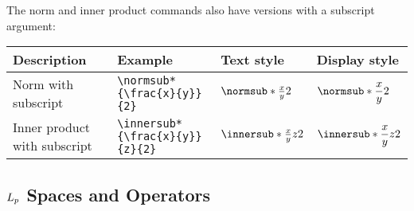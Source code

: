 \documentclass{article}
\begin{document}
The norm and inner product commands also have versions with a subscript argument:

\begin{center}
\begin{tabular}{@{}llll@{}}
\toprule
Description				& Example 					& Text style 				& Display style \\ \midrule
Norm	with subscript				& \verb!\normsub*{\frac{x}{y}}{2}!       	& $\normsub*{\frac{x}{y}}{2}$ 	& $\displaystyle\normsub*{\frac{x}{y}}{2}$ \\[10pt]
Inner product with subscript			& \verb!\innersub*{\frac{x}{y}}{z}{2}!       	& $\innersub*{\frac{x}{y}}{z}{2}$ 	& $\displaystyle\innersub*{\frac{x}{y}}{z}{2}$ \\[10pt]
\bottomrule
\end{tabular}
\end{center}


\subsection{$L_{p}$ Spaces and Operators}
\end{document}
